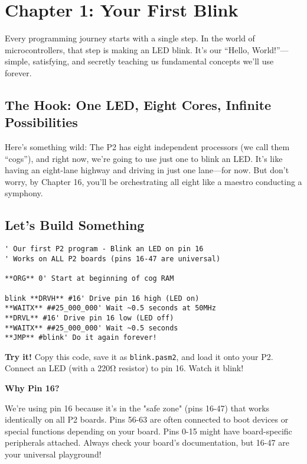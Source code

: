 \documentclass[11pt]{book}
\providecommand{\passthrough}[1]{#1}
\begin{document}
\hypertarget{chapter-1-your-first-blink}{%
\section{Chapter 1: Your First Blink}\label{chapter-1-your-first-blink}}

Every programming journey starts with a single step. In the world of
microcontrollers, that step is making an LED blink. It's our ``Hello,
World!''---simple, satisfying, and secretly teaching us fundamental
concepts we'll use forever.

\hypertarget{the-hook-one-led-eight-cores-infinite-possibilities}{%
\subsection{The Hook: One LED, Eight Cores, Infinite
Possibilities}\label{the-hook-one-led-eight-cores-infinite-possibilities}}

Here's something wild: The P2 has eight independent processors (we call
them ``cogs''), and right now, we're going to use just one to blink an
LED. It's like having an eight-lane highway and driving in just one
lane---for now. But don't worry, by Chapter 16, you'll be orchestrating
all eight like a maestro conducting a symphony.

\hypertarget{lets-build-something}{%
\subsection{Let's Build Something}\label{lets-build-something}}

\begin{lstlisting}
' Our first P2 program - Blink an LED on pin 16
' Works on ALL P2 boards (pins 16-47 are universal)

**ORG** 0' Start at beginning of cog RAM
        
blink **DRVH** #16' Drive pin 16 high (LED on)
**WAITX** ##25_000_000' Wait ~0.5 seconds at 50MHz
**DRVL** #16' Drive pin 16 low (LED off)  
**WAITX** ##25_000_000' Wait ~0.5 seconds
**JMP** #blink' Do it again forever!
\end{lstlisting}

\textbf{Try it!} Copy this code, save it as
\passthrough{\lstinline!blink.pasm2!}, and load it onto your P2. Connect
an LED (with a 220Ω resistor) to pin 16. Watch it blink!

\begin{sidetrack}
\textbf{Why Pin 16?}

We're using pin 16 because it's in the "safe zone" (pins 16-47) that works identically on all P2 boards. Pins 56-63 are often connected to boot devices or special functions depending on your board. Pins 0-15 might have board-specific peripherals attached. Always check your board's documentation, but 16-47 are your universal playground!
\end{sidetrack}
\end{document}
